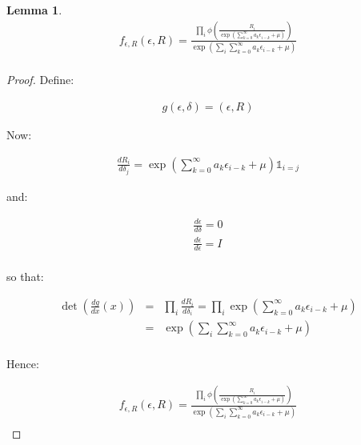 \documentclass{article}
\newtheorem{lemma}{Lemma}
\begin{document}
\begin{lemma}
  \begin{eqnarray*}
    f_{\epsilon,R}\left(\epsilon,R\right) = \frac{\prod_i \phi\left( \frac{R_i}{\exp\left(\sum_{k=0}^\infty a_k \epsilon_{i-k} + \mu\right)}\right)}{\exp\left(\sum_i \sum_{k=0}^\infty a_k \epsilon_{i-k} + \mu\right)}\\
  \end{eqnarray*}
\end{lemma}
\begin{proof}
  Define:

  \begin{eqnarray*}
    g(\epsilon, \delta) = \left(\epsilon, R\right)
  \end{eqnarray*}

  Now:

  \begin{eqnarray*}
    \frac{d\!R_i}{d\!\delta_j} = \exp\left(\sum_{k=0}^\infty a_k\epsilon_{i-k} + \mu\right) \mathbb{1}_{i=j}
  \end{eqnarray*}

  and:

  \begin{eqnarray*}
    \frac{d\!\epsilon}{d\!\delta} = 0\\
    \frac{d\!\epsilon}{d\!\epsilon} = I\\
  \end{eqnarray*}

  so that:

  \begin{eqnarray*}
    \det\left(\frac{d\!g}{d\!x}(x)\right) & = & \prod_i \frac{d\!R_i}{d\!\delta_i} = \prod_i \exp\left(\sum_{k=0}^\infty a_k \epsilon_{i-k} + \mu\right)\\
    & = & \exp\left(\sum_i \sum_{k=0}^\infty a_k \epsilon_{i-k} + \mu\right)\\
  \end{eqnarray*}

  Hence:

  \begin{eqnarray*}
    f_{\epsilon,R}\left(\epsilon,R\right) = \frac{\prod_i \phi\left( \frac{R_i}{\exp\left(\sum_{k=0}^\infty a_k \epsilon_{i-k} + \mu\right)}\right)}{\exp\left(\sum_i \sum_{k=0}^\infty a_k \epsilon_{i-k} + \mu\right)}\\
  \end{eqnarray*}
\end{proof}
\end{document}

